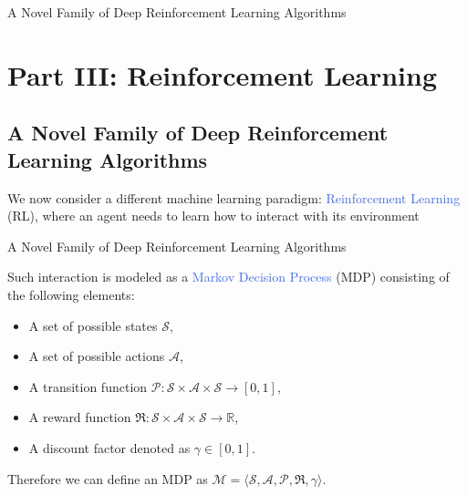 \documentclass{beamer}
\begin{document}


\begin{frame}{A Novel Family of Deep Reinforcement Learning Algorithms}
	\section{Part III: Reinforcement Learning}
	\subsection{A Novel Family of Deep Reinforcement Learning Algorithms}

	\bigskip
	We now consider a different machine learning paradigm: \textcolor{RoyalBlue}{Reinforcement Learning} (RL), where an agent needs to learn how to interact with its environment

	\begin{figure}[htb!]
		\centering
		
 		\label{fig:rl_loop}
	\end{figure}

\end{frame}

\begin{frame}{A Novel Family of Deep Reinforcement Learning Algorithms}

	Such interaction is modeled as a \textcolor{RoyalBlue}{Markov Decision Process} (MDP) consisting of the following elements:

\begin{itemize}
	\item A set of possible states $\mathcal{S}$,
	\item A set of possible actions $\mathcal{A}$,
	\item A transition function $\mathcal{P}:\mathcal{S}\times\mathcal{A}\times\mathcal{S}\rightarrow [0,1]$,
	\item A reward function $\Re:\mathcal{S}\times\mathcal{A}\times\mathcal{S}\rightarrow \mathbb{R}$,
	\item A discount factor denoted as $\gamma \in [0,1]$.
\end{itemize}

\bigskip

Therefore we can define an MDP as $\mathcal{M}=\langle\mathcal{S}, \mathcal{A}, \mathcal{P}, \Re, \gamma\rangle$.

\end{frame}
\end{document}

